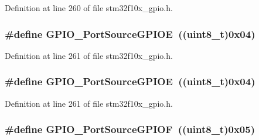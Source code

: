 Definition at line 260 of file stm32f10x\+\_\+gpio.\+h.

\subsubsection[{\texorpdfstring{G\+P\+I\+O\+\_\+\+Port\+Source\+G\+P\+I\+OE}{GPIO_PortSourceGPIOE}}]{\setlength{\rightskip}{0pt plus 5cm}\#define G\+P\+I\+O\+\_\+\+Port\+Source\+G\+P\+I\+OE~(({\bf uint8\+\_\+t})0x04)}\hypertarget{group___g_p_i_o___port___sources_ga8b849f35292768d73a9f9a76cac96456}{}\label{group___g_p_i_o___port___sources_ga8b849f35292768d73a9f9a76cac96456}


Definition at line 261 of file stm32f10x\+\_\+gpio.\+h.

\subsubsection[{\texorpdfstring{G\+P\+I\+O\+\_\+\+Port\+Source\+G\+P\+I\+OE}{GPIO_PortSourceGPIOE}}]{\setlength{\rightskip}{0pt plus 5cm}\#define G\+P\+I\+O\+\_\+\+Port\+Source\+G\+P\+I\+OE~(({\bf uint8\+\_\+t})0x04)}\hypertarget{group___g_p_i_o___port___sources_ga8b849f35292768d73a9f9a76cac96456}{}\label{group___g_p_i_o___port___sources_ga8b849f35292768d73a9f9a76cac96456}


Definition at line 261 of file stm32f10x\+\_\+gpio.\+h.

\subsubsection[{\texorpdfstring{G\+P\+I\+O\+\_\+\+Port\+Source\+G\+P\+I\+OF}{GPIO_PortSourceGPIOF}}]{\setlength{\rightskip}{0pt plus 5cm}\#define G\+P\+I\+O\+\_\+\+Port\+Source\+G\+P\+I\+OF~(({\bf uint8\+\_\+t})0x05)}\hypertarget{group___g_p_i_o___port___sources_ga19dfaf7ac2cdf66b697bcd8665b860ef}{}\label{group___g_p_i_o___port___sources_ga19dfaf7ac2cdf66b697bcd8665b860ef}


